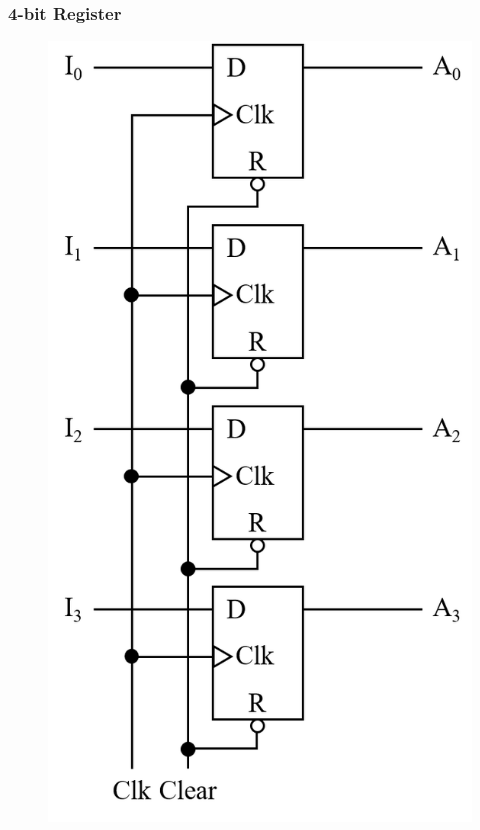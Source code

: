 \documentclass[a4paper]{article}
\begin{document}
\subsubsection{4-bit Register}
\begin{minipage}[t]{0.35\textwidth}
    \begin{figure}[H]
    \centering
    \includegraphics[width=\textwidth]{4bitreg.png}
\end{figure}
\end{minipage}
\end{document}
